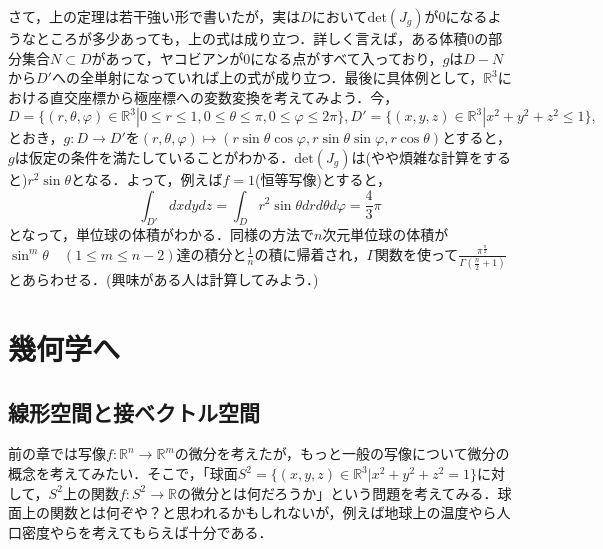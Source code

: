 \documentclass{jsarticle}
\def\realnum{{\mathbb R}}
\def\dfrac{\displaystyle\frac}
\def\det{{\mathrm{det}}}
\begin{document}
さて，上の定理は若干強い形で書いたが，実は$D$において$\det(J_g)$が0になるようなところが多少あっても，上の式は成り立つ．詳しく言えば，ある体積0の部分集合$N\subset D$があって，ヤコビアンが0になる点がすべて入っており，$g$は$D-N$から$D'$への全単射になっていれば上の式が成り立つ．最後に具体例として，$\realnum^3$における直交座標から極座標への変数変換を考えてみよう．今，$D=\{(r,\theta,\varphi)\in\realnum^3|0\le r\le1,0\le \theta \le \pi,0\le \varphi \le 2\pi\},D'=\{(x,y,z)\in\realnum^3|x^2+y^2+z^2\le 1\},$とおき，$g:D\rightarrow D'$を$(r,\theta,\varphi)\mapsto (r\sin\theta\cos\varphi,r\sin\theta\sin\varphi,r\cos\theta)$とすると，$g$は仮定の条件を満たしていることがわかる．$\det(J_g)$は(やや煩雑な計算をすると)$r^2\sin\theta$となる．よって，例えば$f=1$(恒等写像)とすると，
$$
\int_{D'}dxdydz=\int_{D}r^2\sin\theta drd\theta d\varphi=\frac{4}{3}\pi
$$
となって，単位球の体積がわかる．同様の方法で$n$次元単位球の体積が$\sin^m\theta\quad(1\le m\le n-2)$達の積分と$\frac{1}{n}$の積に帰着され，$\Gamma$関数を使って$\dfrac{\pi^{\frac{n}{2}}}{\Gamma(\frac{n}{2}+1)}$とあらわせる．(興味がある人は計算してみよう．)


\section{幾何学へ}
\subsection{線形空間と接ベクトル空間}
前の章では写像$f:\realnum^n\rightarrow\realnum^m$の微分を考えたが，もっと一般の写像について微分の概念を考えてみたい．そこで，「球面$S^2=\{(x,y,z)\in\realnum^3|x^2+y^2+z^2=1\}$に対して，$S^2$上の関数$f:S^2\rightarrow\realnum$の微分とは何だろうか」という問題を考えてみる．球面上の関数とは何ぞや？と思われるかもしれないが，例えば地球上の温度やら人口密度やらを考えてもらえば十分である．
\end{document}
